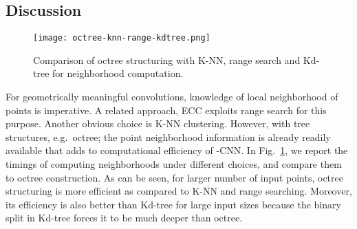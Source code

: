 \documentclass[10pt,twocolumn,letterpaper]{article}
\begin{document}
{\subsection{Discussion}
\begin{figure}[h!]
\texttt{[image: octree-knn-range-kdtree.png]}
\caption{Comparison of octree structuring with K-NN, range search and Kd-tree for neighborhood computation. }\label{time-analysis}
\label{fig:graphs}
\vspace{-4mm}
\end{figure}
For geometrically meaningful convolutions, knowledge of local neighborhood of points is imperative. A related approach, ECC \cite{simonovsky2017dynamic} exploits range search for this purpose. Another obvious choice is K-NN clustering. However, with tree structures, e.g.~octree; the point neighborhood information is already readily available that adds to computational efficiency of -CNN. In Fig.~\ref{fig:graphs}, we report the timings of computing neighborhoods under different choices, and compare them to octree construction. As can be seen, for larger number of input points, octree structuring is more efficient as compared to K-NN and range searching. Moreover, its efficiency is also better than Kd-tree for large input sizes because the binary split in Kd-tree forces it to be much deeper than octree.  


}
\end{document}
